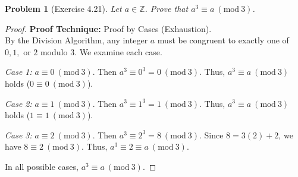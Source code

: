 \documentclass[11pt]{article}
\newtheorem{problem}{Problem}
\newcommand{\Z}{\mathbb{Z}}
\newcommand{\modulo}[1]{\ (\mathrm{mod}\ #1)}
\begin{document}
\vspace{0.5cm}

\begin{problem}[Exercise 4.21]
Let $a \in \Z$. Prove that $a^3 \equiv a \modulo{3}$.
\end{problem}
\begin{proof}
\textbf{Proof Technique:} Proof by Cases (Exhaustion). \\
By the Division Algorithm, any integer $a$ must be congruent to exactly one of $0, 1,$ or $2$ modulo $3$. We examine each case.

\textit{Case 1:} $a \equiv 0 \modulo{3}$.
Then $a^3 \equiv 0^3 = 0 \modulo{3}$.
Thus, $a^3 \equiv a \modulo{3}$ holds ($0 \equiv 0 \modulo{3}$).

\textit{Case 2:} $a \equiv 1 \modulo{3}$.
Then $a^3 \equiv 1^3 = 1 \modulo{3}$.
Thus, $a^3 \equiv a \modulo{3}$ holds ($1 \equiv 1 \modulo{3}$).

\textit{Case 3:} $a \equiv 2 \modulo{3}$.
Then $a^3 \equiv 2^3 = 8 \modulo{3}$.
Since $8 = 3(2) + 2$, we have $8 \equiv 2 \modulo{3}$.
Thus, $a^3 \equiv 2 \equiv a \modulo{3}$.

In all possible cases, $a^3 \equiv a \modulo{3}$.
\end{proof}

\vspace{0.5cm}
\end{document}

